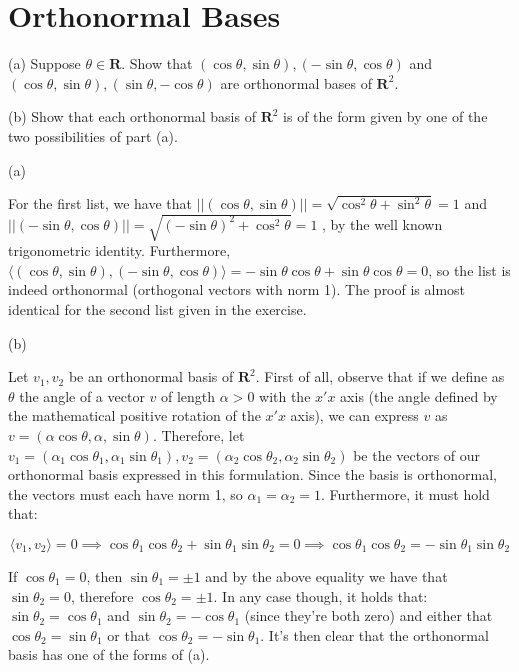 \newpage
\section{Orthonormal Bases}

\begin{exercise}{1}
    (a) Suppose $\theta \in \mathbf{R}$. Show that $(\cos \theta, \sin \theta), (-\sin \theta, \cos \theta)$ and $(\cos \theta, \sin \theta), (\sin \theta, -\cos \theta)$ are orthonormal bases of $\mathbf{R}^2$.
    
    (b) Show that each orthonormal basis of $\mathbf{R}^2$ is of the form given by one of the two possibilities of part (a).
\end{exercise}

\begin{solution}

(a) 

For the first list, we have that $\lvert \lvert(\cos \theta, \sin \theta) \rvert \rvert = \sqrt{\cos^2 \theta + \sin^2\theta} = 1$ and \\ $\lvert \lvert (-\sin \theta, \cos \theta) \rvert \rvert = \sqrt{(-\sin \theta)^2 + \cos^2 \theta} = 1$ , by the well known trigonometric identity. Furthermore, $\langle (\cos \theta, \sin \theta), (-\sin \theta, \cos \theta) \rangle = -\sin \theta \cos \theta + \sin \theta \cos \theta = 0$, so the list is indeed orthonormal (orthogonal vectors with norm 1). The proof is almost identical for the second list given in the exercise.

(b) 

Let $v_1, v_2$ be an orthonormal basis of $\mathbf{R}^2$. First of all, observe that if we define as $\theta$ the angle of a vector $v$ of length $\alpha > 0$ with the $x'x$ axis (the angle defined by the mathematical positive rotation of the $x'x$ axis), we can express $v$ as $v = (\alpha \cos \theta, \alpha, \sin \theta)$. Therefore, let $v_1 = (\alpha_1 \cos {\theta}_1, \alpha_1 \sin {\theta}_1), v_2 = (\alpha_2 \cos {\theta}_2, \alpha_2 \sin {\theta}_2)$ be the vectors of our orthonormal basis expressed in this formulation. Since the basis is orthonormal, the vectors must each have norm 1, so $\alpha_1 = \alpha_2 = 1$. Furthermore, it must hold that:

$$\langle v_1, v_2 \rangle = 0 \implies \cos \theta_1 \cos \theta_2 + \sin \theta_1 \sin \theta_2 = 0 \implies \cos \theta_1 \cos \theta_2 = -\sin \theta_1 \sin \theta_2$$

If $\cos \theta_1 = 0$, then $\sin \theta_1 = \pm 1$ and by the above equality we have that $\sin \theta_2 = 0$, therefore $\cos \theta_2 = \pm 1$. In any case though, it holds that: $\sin \theta_2 = \cos \theta_1$ and $\sin \theta_2 = - \cos \theta_1$ (since they're both zero) and either that $\cos \theta_2 = \sin \theta_1$ or that $\cos \theta_2 = -\sin \theta_1$. It's then clear that the orthonormal basis has one of the forms of (a).


\end{solution}
